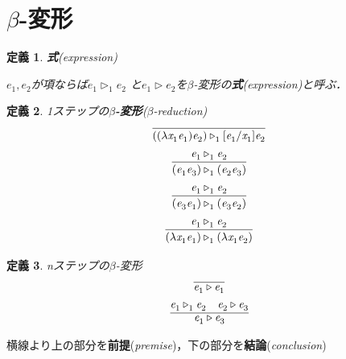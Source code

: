 \documentclass{ltjsbook}%
\newtheorem{definition}{定義}[section]%
\newcommand\term[2]{\textbf{#1}{(\textit{#2})}}%
\begin{document}
\section{$\beta$-変形}%
\label{sect:beta}%
\begin{definition}%
  \term{式}{expression}%
  \par$\mathit{e}_1^{},\mathit{e}_2^{}$が項ならば$\mathit{e}_1^{}\triangleright_1^{}\mathit{e}_2^{}$%
  と$\mathit{e}_1^{}\triangleright\mathit{e}_2^{}$を$\beta$-変形の\term{式}{expression}と呼ぶ．%
\end{definition}%
\begin{definition}%
1ステップの\term{$\beta$-変形}{$\beta$-reduction}%
\begin{equation}%
  \infer{%
    ((\lambda\mathit{x}_1^{}\mathit{e}_1^{})\mathit{e}_2^{})\triangleright_1^{}%
    [\mathit{e}_1^{}/\mathit{x}_1^{}]\mathit{e}_2^{}%
  }{%
  }%
\end{equation}%
\begin{equation}%
  \infer{%
    (\mathit{e}_1^{}\mathit{e}_3^{})\triangleright_1^{}(\mathit{e}_2^{}\mathit{e}_3^{})%
  }{%
    \mathit{e}_1^{}\triangleright_1^{}\mathit{e}_2^{}%
  }%
\end{equation}%
\begin{equation}%
  \infer{%
    (\mathit{e}_3^{}\mathit{e}_1^{})\triangleright_1^{}(\mathit{e}_3^{}\mathit{e}_2^{})%
  }{%
    \mathit{e}_1^{}\triangleright_1^{}\mathit{e}_2^{}%
  }%
\end{equation}%
\begin{equation}%
  \infer{%
    (\lambda\mathit{x}_1^{}\mathit{e}_1^{})\triangleright_1^{}%
    (\lambda\mathit{x}_1^{}\mathit{e}_2^{})%
  }{%
    \mathit{e}_1^{}\triangleright_1^{}\mathit{e}_2^{}%
  }%
\end{equation}%
\end{definition}%
\begin{definition}%
nステップの$\beta$-変形%
\begin{equation}%
  \infer{%
    \mathit{e}_1^{}\triangleright\mathit{e}_1^{}%
  }{%
  }%
\end{equation}%
\begin{equation}%
  \infer{%
    \mathit{e}_1^{}\triangleright\mathit{e}_3^{}%
  }{%
    \mathit{e}_1^{}\triangleright_1^{}\mathit{e}_2^{}%
  &%
    \mathit{e}_2^{}\triangleright\mathit{e}_3^{}%
  }%
\end{equation}%
\end{definition}%
\par 横線より上の部分を\term{前提}{premise}，下の部分を\term{結論}{conclusion}%
\end{document}
